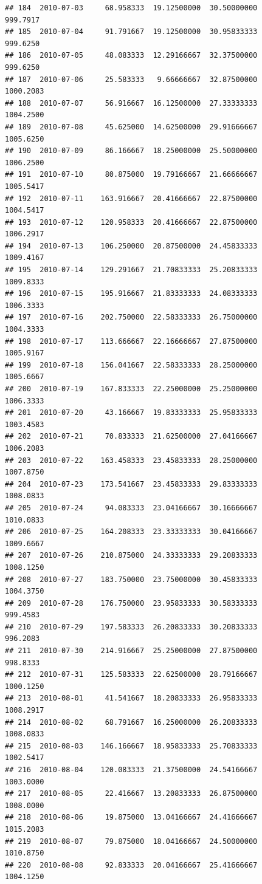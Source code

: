 \documentclass[
]{article}
\begin{document}
\begin{verbatim}
## 184  2010-07-03     68.958333  19.12500000  30.50000000     999.7917
## 185  2010-07-04     91.791667  19.12500000  30.95833333     999.6250
## 186  2010-07-05     48.083333  12.29166667  32.37500000     999.6250
## 187  2010-07-06     25.583333   9.66666667  32.87500000    1000.2083
## 188  2010-07-07     56.916667  16.12500000  27.33333333    1004.2500
## 189  2010-07-08     45.625000  14.62500000  29.91666667    1005.6250
## 190  2010-07-09     86.166667  18.25000000  25.50000000    1006.2500
## 191  2010-07-10     80.875000  19.79166667  21.66666667    1005.5417
## 192  2010-07-11    163.916667  20.41666667  22.87500000    1004.5417
## 193  2010-07-12    120.958333  20.41666667  22.87500000    1006.2917
## 194  2010-07-13    106.250000  20.87500000  24.45833333    1009.4167
## 195  2010-07-14    129.291667  21.70833333  25.20833333    1009.8333
## 196  2010-07-15    195.916667  21.83333333  24.08333333    1006.3333
## 197  2010-07-16    202.750000  22.58333333  26.75000000    1004.3333
## 198  2010-07-17    113.666667  22.16666667  27.87500000    1005.9167
## 199  2010-07-18    156.041667  22.58333333  28.25000000    1005.6667
## 200  2010-07-19    167.833333  22.25000000  25.25000000    1006.3333
## 201  2010-07-20     43.166667  19.83333333  25.95833333    1003.4583
## 202  2010-07-21     70.833333  21.62500000  27.04166667    1006.2083
## 203  2010-07-22    163.458333  23.45833333  28.25000000    1007.8750
## 204  2010-07-23    173.541667  23.45833333  29.83333333    1008.0833
## 205  2010-07-24     94.083333  23.04166667  30.16666667    1010.0833
## 206  2010-07-25    164.208333  23.33333333  30.04166667    1009.6667
## 207  2010-07-26    210.875000  24.33333333  29.20833333    1008.1250
## 208  2010-07-27    183.750000  23.75000000  30.45833333    1004.3750
## 209  2010-07-28    176.750000  23.95833333  30.58333333     999.4583
## 210  2010-07-29    197.583333  26.20833333  30.20833333     996.2083
## 211  2010-07-30    214.916667  25.25000000  27.87500000     998.8333
## 212  2010-07-31    125.583333  22.62500000  28.79166667    1000.1250
## 213  2010-08-01     41.541667  18.20833333  26.95833333    1008.2917
## 214  2010-08-02     68.791667  16.25000000  26.20833333    1008.0833
## 215  2010-08-03    146.166667  18.95833333  25.70833333    1002.5417
## 216  2010-08-04    120.083333  21.37500000  24.54166667    1003.0000
## 217  2010-08-05     22.416667  13.20833333  26.87500000    1008.0000
## 218  2010-08-06     19.875000  13.04166667  24.41666667    1015.2083
## 219  2010-08-07     79.875000  18.04166667  24.50000000    1010.8750
## 220  2010-08-08     92.833333  20.04166667  25.41666667    1004.1250

\end{verbatim}
\end{document}
